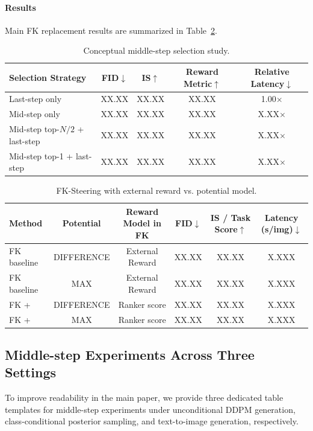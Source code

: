 \documentclass{article}
\newcommand{\method}{\text{Diffusion Ranker}\xspace}
\begin{document}
\paragraph{Results}
Main FK replacement results are summarized in Table~\ref{tab:fk_ranker_replace}.

\begin{table}[htbp]
\centering
\caption{Conceptual middle-step selection study.}
\label{tab:midstep_conceptual}
\begin{tabular}{lcccc}
\toprule
Selection Strategy & FID$\downarrow$ & IS$\uparrow$ & Reward Metric$\uparrow$ & Relative Latency$\downarrow$ \\
\midrule
Last-step only & XX.XX & XX.XX & XX.XX & 1.00$\times$ \\
Mid-step only & XX.XX & XX.XX & XX.XX & X.XX$\times$ \\
Mid-step top-$N/2$ + last-step & XX.XX & XX.XX & XX.XX & X.XX$\times$ \\
Mid-step top-1 + last-step & XX.XX & XX.XX & XX.XX & X.XX$\times$ \\
\bottomrule
\end{tabular}
\end{table}

\begin{table}[htbp]
\centering
\caption{FK-Steering with external reward vs. \method potential model.}
\label{tab:fk_ranker_replace}
\begin{tabular}{lccccc}
\toprule
Method & Potential & Reward Model in FK & FID$\downarrow$ & IS / Task Score$\uparrow$ & Latency (s/img)$\downarrow$ \\
\midrule
FK baseline & DIFFERENCE & External Reward & XX.XX & XX.XX & X.XXX \\
FK baseline & MAX & External Reward & XX.XX & XX.XX & X.XXX \\
FK + \method & DIFFERENCE & Ranker score & XX.XX & XX.XX & X.XXX \\
FK + \method & MAX & Ranker score & XX.XX & XX.XX & X.XXX \\
\bottomrule
\end{tabular}
\end{table}

\subsection{Middle-step Experiments Across Three Settings}
\label{sec:midstep_three_settings}

To improve readability in the main paper, we provide three dedicated table templates for middle-step experiments under unconditional DDPM generation, class-conditional posterior sampling, and text-to-image generation, respectively.
\end{document}
